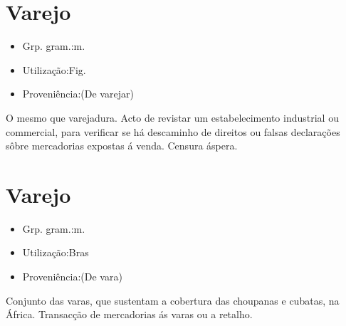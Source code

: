 \documentclass{article}
\begin{document}
\section{Varejo}
\begin{itemize}
\item {Grp. gram.:m.}
\end{itemize}
\begin{itemize}
\item {Utilização:Fig.}
\end{itemize}
\begin{itemize}
\item {Proveniência:(De \textunderscore varejar\textunderscore )}
\end{itemize}
O mesmo que \textunderscore varejadura\textunderscore .
Acto de revistar um estabelecimento industrial ou commercial, para verificar se há descaminho de direitos ou falsas declarações sôbre mercadorias expostas á venda.
Censura áspera.
\section{Varejo}
\begin{itemize}
\item {Grp. gram.:m.}
\end{itemize}
\begin{itemize}
\item {Utilização:Bras}
\end{itemize}
\begin{itemize}
\item {Proveniência:(De \textunderscore vara\textunderscore )}
\end{itemize}
Conjunto das varas, que sustentam a cobertura das choupanas e cubatas, na África.
Transacção de mercadorias ás varas ou a retalho.
\end{document}
